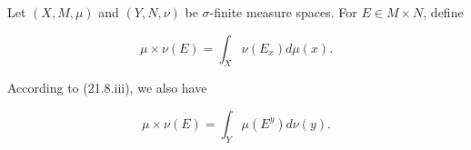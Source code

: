 Let $(X, M, \mu)$ and $(Y, N, \nu)$ be $\sigma$-finite measure spaces. For $E \in M \times N$, define

$$\mu \times \nu(E) = \int_X \nu(E_x) d\mu(x).$$

According to (21.8.iii), we also have

$$\mu \times \nu(E) = \int_Y \mu(E^y) d\nu(y).$$